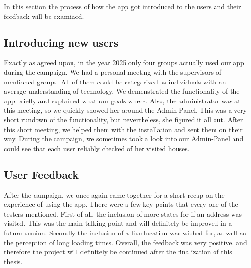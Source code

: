 \Author{\daAuthorTwo}

In this section the process of how the app got introduced to the users and their feedback will be examined.

\blankLine

\subsection{Introducing new users}

Exactly as agreed upon, in the year 2025 only four groups actually used our app during the campaign. We had a personal meeting with the supervisors of mentioned groups. All of them could be categorized as individuals with an average understanding of technology. We demonstrated the functionality of the app briefly and explained what our goals where. Also, the administrator was at this meeting, so we quickly showed her around the Admin-Panel. This was a very short rundown of the functionality, but nevertheless, she figured it all out. After this short meeting, we helped them with the installation and sent them on their way. During the campaign, we sometimes took a look into our Admin-Panel and could see that each user reliably checked of her visited houses.  

\subsection{User Feedback}

After the campaign, we once again came together for a short recap on the experience of using the app. There were a few key points that every one of the testers mentioned. First of all, the inclusion of more states for if an address was visited. This was the main talking point and will definitely be improved in a future version. Secondly the inclusion of a live location was wished for, as well as the perception of long loading times. Overall, the feedback was very positive, and therefore the project will definitely be continued after the finalization of this thesis. 

\newpage